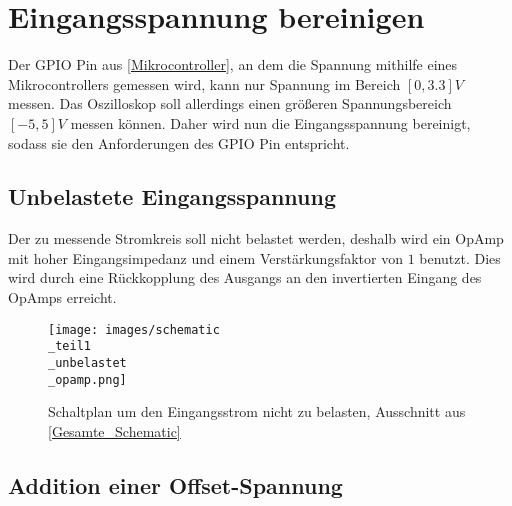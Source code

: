 \section{Eingangsspannung bereinigen}
\label{Eingangsspannung bereinigen}

Der GPIO Pin aus \autoref{Mikrocontroller}, an dem die Spannung mithilfe eines Mikrocontrollers gemessen wird,
kann nur Spannung im Bereich $[0, 3.3]V$ messen.
Das Oszilloskop soll allerdings einen größeren Spannungsbereich $[-5, 5]V$ messen können.
Daher wird nun die Eingangsspannung bereinigt, sodass sie den Anforderungen des GPIO Pin entspricht.

\subsection{Unbelastete Eingangsspannung}
\label{Unbelastete Eingangsspannung}
Der zu messende Stromkreis soll nicht belastet werden, deshalb wird ein OpAmp mit
hoher Eingangsimpedanz und einem Verstärkungsfaktor von $1$ benutzt.
Dies wird durch eine Rückkopplung des Ausgangs an den invertierten Eingang des OpAmps erreicht.
\begin{figure}[h]
	\centering
	\texttt{[image: images/schematic\\\_teil1\\\_unbelastet\\\_opamp.png]}
	\caption{Schaltplan um den Eingangsstrom nicht zu belasten, Ausschnitt aus \ref{Gesamte_Schematic}}
\end{figure}


\subsection{Addition einer Offset-Spannung}
\label{Addition einer Offset-Spannung}

